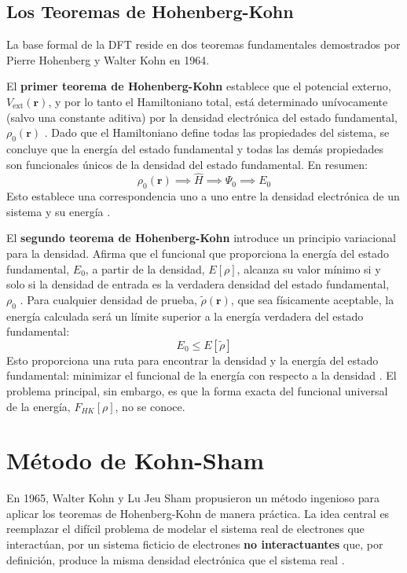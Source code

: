\subsection{Los Teoremas de Hohenberg-Kohn}
La base formal de la DFT reside en dos teoremas fundamentales demostrados por Pierre Hohenberg y Walter Kohn en 1964.

El \textbf{primer teorema de Hohenberg-Kohn} establece que el potencial externo, $V_{\text{ext}}(\mathbf{r})$, y por lo tanto el Hamiltoniano total, está determinado unívocamente (salvo una constante aditiva) por la densidad electrónica del estado fundamental, $\rho_0(\mathbf{r})$ \cite[50]{koch2015chemist}. Dado que el Hamiltoniano define todas las propiedades del sistema, se concluye que la energía del estado fundamental y todas las demás propiedades son funcionales únicos de la densidad del estado fundamental. En resumen:
$$ \rho_0(\mathbf{r}) \implies \hat{H} \implies \Psi_0 \implies E_0 $$
Esto establece una correspondencia uno a uno entre la densidad electrónica de un sistema y su energía \cite[253]{jensen2017introduction}.

El \textbf{segundo teorema de Hohenberg-Kohn} introduce un principio variacional para la densidad. Afirma que el funcional que proporciona la energía del estado fundamental, $E_0$, a partir de la densidad, $E[\rho]$, alcanza su valor mínimo si y solo si la densidad de entrada es la verdadera densidad del estado fundamental, $\rho_0$ \cite[53]{koch2015chemist}. Para cualquier densidad de prueba, $\tilde{\rho}(\mathbf{r})$, que sea físicamente aceptable, la energía calculada será un límite superior a la energía verdadera del estado fundamental:
$$ E_0 \le E[\tilde{\rho}] $$
Esto proporciona una ruta para encontrar la densidad y la energía del estado fundamental: minimizar el funcional de la energía con respecto a la densidad \cite[53]{koch2015chemist}. El problema principal, sin embargo, es que la forma exacta del funcional universal de la energía, $F_{HK}[\rho]$, no se conoce.

\section{Método de Kohn-Sham}
En 1965, Walter Kohn y Lu Jeu Sham propusieron un método ingenioso para aplicar los teoremas de Hohenberg-Kohn de manera práctica. La idea central es reemplazar el difícil problema de modelar el sistema real de electrones que interactúan, por un sistema ficticio de electrones \textbf{no interactuantes} que, por definición, produce la misma densidad electrónica que el sistema real \cite[58]{koch2015chemist}.

